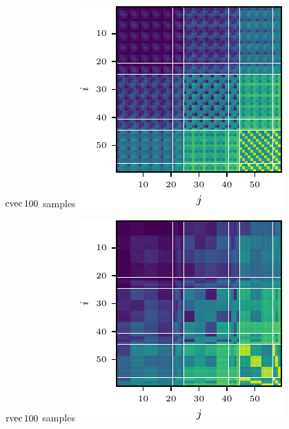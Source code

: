 \begin{figure}
\begin{minipage}[t]{0.495\linewidth}
  \end{minipage}
  \\
  \begin{minipage}[t]{0.495\linewidth}
    \centering
    $\operatorname{cvec} 100$ samples\vspace{1ex}
    \includegraphics[width=0.8\linewidth]{../kfs/plots/synthetic_cvec_mcfisher_100.pdf}
  \end{minipage}
  \hfill
  \begin{minipage}[t]{0.495\linewidth}
    \centering
    $\operatorname{rvec} 100$ samples\vspace{1ex}
    \includegraphics[width=0.8\linewidth]{../kfs/plots/synthetic_rvec_mcfisher_100.pdf}

\end{minipage}
\end{figure}
